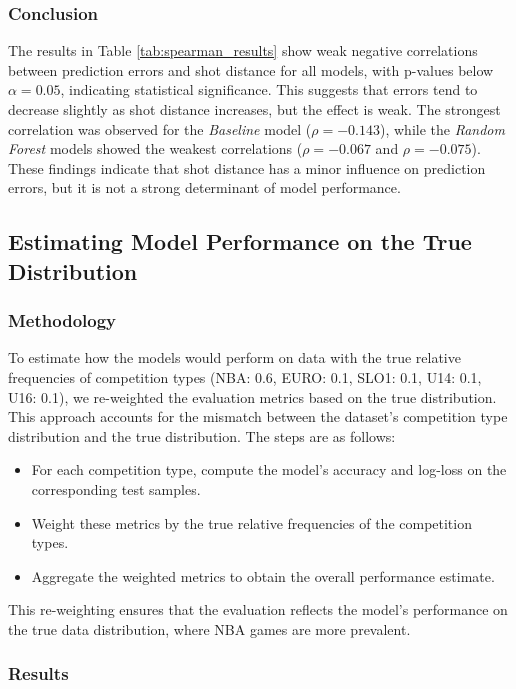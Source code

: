 \documentclass[fleqn,moreauthors,10pt]{ds_report}
\begin{document}
\subsubsection*{Conclusion}
The results in Table \ref{tab:spearman_results} show weak negative correlations between prediction errors and shot distance for all models, with p-values below \( \alpha = 0.05 \), indicating statistical significance. This suggests that errors tend to decrease slightly as shot distance increases, but the effect is weak. The strongest correlation was observed for the \textit{Baseline} model (\( \rho = -0.143 \)), while the \textit{Random Forest} models showed the weakest correlations (\( \rho = -0.067 \) and \( \rho = -0.075 \)). These findings indicate that shot distance has a minor influence on prediction errors, but it is not a strong determinant of model performance.


\subsection*{Estimating Model Performance on the True Distribution}

\subsubsection*{Methodology}
To estimate how the models would perform on data with the true relative frequencies of competition types (NBA: 0.6, EURO: 0.1, SLO1: 0.1, U14: 0.1, U16: 0.1), we re-weighted the evaluation metrics based on the true distribution. This approach accounts for the mismatch between the dataset's competition type distribution and the true distribution. The steps are as follows:
\begin{itemize}
    \item For each competition type, compute the model's accuracy and log-loss on the corresponding test samples.
    \item Weight these metrics by the true relative frequencies of the competition types.
    \item Aggregate the weighted metrics to obtain the overall performance estimate.
\end{itemize}

This re-weighting ensures that the evaluation reflects the model's performance on the true data distribution, where NBA games are more prevalent.

\subsubsection*{Results}
\end{document}
